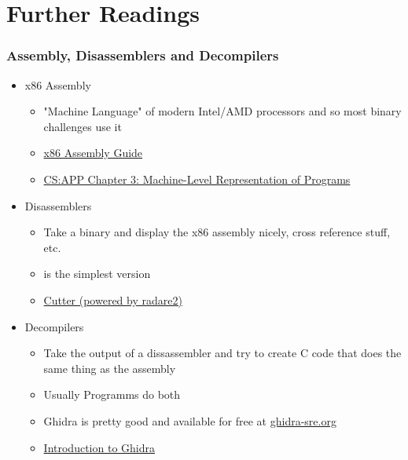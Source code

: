 \documentclass[aspectratio=169]{beamer}
\begin{document}
\section{Further Readings}
\begin{frame}[fragile]
    \frametitle{Assembly, Disassemblers and Decompilers}
    \begin{itemize}
        \item x86 Assembly
        \begin{itemize}
            \item "Machine Language" of modern Intel/AMD processors and so most binary challenges use it
            \item \href{http://www.cs.virginia.edu/~evans/cs216/guides/x86.html}{x86 Assembly Guide}
            \item \href{http://gec.di.uminho.pt/DISCIP/MaisAC/CS-APP_Bryant/csapp.preview3.pdf}{CS:APP Chapter 3: Machine-Level Representation of Programs}
        \end{itemize}
        \item Disassemblers
        \begin{itemize}
            \item Take a binary and display the x86 assembly nicely, cross reference stuff, etc.
            \item {} is the simplest version
            \item \href{https://cutter.re}{Cutter (powered by radare2)}
        \end{itemize}
        \item Decompilers
        \begin{itemize}
            \item Take the output of a dissassembler and try to create C code that does the same thing as the assembly
            \item Usually Programms do both
            \item Ghidra is pretty good and available for free at \href{https://ghidra-sre.org}{ghidra-sre.org}
            \item \href{https://ghidra.re/courses/GhidraClass/Beginner/Introduction_to_Ghidra_Student_Guide.html}{Introduction to Ghidra}
        \end{itemize}
    \end{itemize}

\end{frame}
\end{document}
